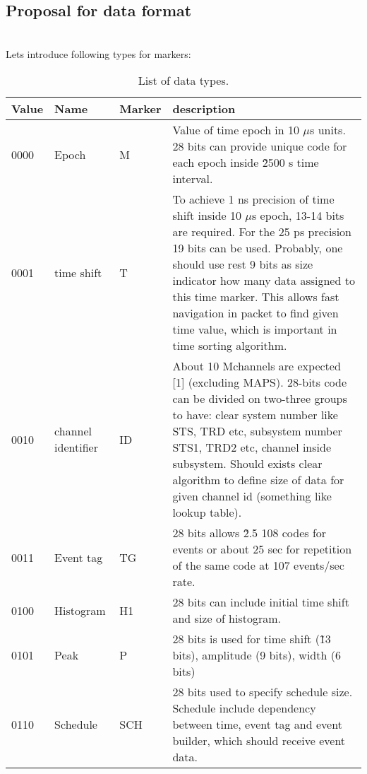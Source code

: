 \subsection{Proposal for data format}
\\
Lets introduce following types for markers:

\begin{table}[h]
\centering
\begin{tabular}{|p{1.0cm}|p{2.0cm}|p{1.0cm}|p{10.0cm}|} \hline

Value & Name &   Marker & description \\ \hline
0000  &  Epoch & M &
Value of time epoch in 10 $\mu$s units. 28 bits can provide unique code for each
epoch inside \~ 2500 s time interval. \\ \hline
0001  &  time shift & T &
To achieve 1 ns precision of time shift inside 10 $\mu$s epoch, 13-14 bits are required.
For the 25 ps precision 19 bits can be used.
Probably, one should use rest 9 bits as size indicator how many data assigned to this time marker.
This allows fast navigation in packet to find given time value, which is important in time sorting
algorithm. \\ \hline
0010  &  channel identifier & ID &
About 10 Mchannels are expected [1] (excluding MAPS). 28-bits code can be divided on
two-three groups to have: clear system number like STS, TRD etc, subsystem number STS1,
TRD2 etc, channel inside subsystem. Should exists clear algorithm to define size of data
for given channel id (something like lookup table). \\ \hline
0011  &  Event tag & TG &
28 bits allows \~ 2.5 108 codes for events or about 25 sec for repetition of the same
code at 107 events/sec rate. \\ \hline
0100   & Histogram & H1 &
28 bits can include initial time shift and size of histogram. \\ \hline
0101  &  Peak & P &
28 bits is used for time shift (\~ 13 bits), amplitude (9 bits), width (6 bits) \\ \hline
0110   & Schedule & SCH &
28 bits used to specify schedule size. Schedule include dependency between time,
event tag and event builder, which should receive event data. \\ \hline
\end{tabular}
\caption{List of data types.}
\label{SW-data-format}
\end{table}

